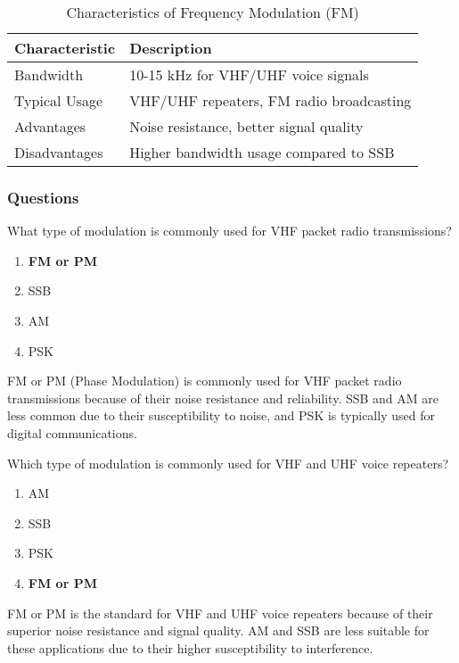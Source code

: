 \begin{table}[htbp]
    \centering
    \caption{Characteristics of Frequency Modulation (FM)}
    \label{tab:fm-characteristics}
    \begin{tabular}{|l|l|}
        \hline
        \textbf{Characteristic} & \textbf{Description} \\
        \hline
        Bandwidth & 10-15 kHz for VHF/UHF voice signals \\
        \hline
        Typical Usage & VHF/UHF repeaters, FM radio broadcasting \\
        \hline
        Advantages & Noise resistance, better signal quality \\
        \hline
        Disadvantages & Higher bandwidth usage compared to SSB \\
        \hline
    \end{tabular}
\end{table}

\subsubsection{Questions}

\begin{tcolorbox}[colback=gray!10!white,colframe=black!75!black,title={T8A02}]
    What type of modulation is commonly used for VHF packet radio transmissions?
    \begin{enumerate}[label=\Alph*),noitemsep]
        \item \textbf{FM or PM}
        \item SSB
        \item AM
        \item PSK
    \end{enumerate}
\end{tcolorbox}
FM or PM (Phase Modulation) is commonly used for VHF packet radio transmissions because of their noise resistance and reliability. SSB and AM are less common due to their susceptibility to noise, and PSK is typically used for digital communications.

\begin{tcolorbox}[colback=gray!10!white,colframe=black!75!black,title={T8A04}]
    Which type of modulation is commonly used for VHF and UHF voice repeaters?
    \begin{enumerate}[label=\Alph*),noitemsep]
        \item AM
        \item SSB
        \item PSK
        \item \textbf{FM or PM}
    \end{enumerate}
\end{tcolorbox}
FM or PM is the standard for VHF and UHF voice repeaters because of their superior noise resistance and signal quality. AM and SSB are less suitable for these applications due to their higher susceptibility to interference.

